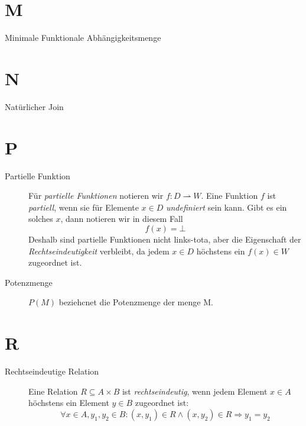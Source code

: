 \section*{M}

\begin{description}
    \item[Minimale Funktionale Abhängigkeitsmenge]
\end{description}

\section*{N}

\begin{description}
    \item[Natürlicher Join]
\end{description}


\section*{P}

\begin{description}
    \item[Partielle Funktion]
    Für \textit{partielle Funktionen} notieren wir $f : D \rightharpoonup W$.
    Eine Funktion $f$ ist \textit{partiell}, wenn sie für Elemente $x \in D$ \textit{undefiniert} sein kann.
    Gibt es ein solches $x$, dann notieren wir in diesem Fall
    \[
        f(x) = \bot
    \]
    \noindent
    Deshalb sind partielle Funktionen nicht links-tota, aber die Eigenschaft der \textit{Rechtseindeutigkeit} verbleibt, da jedem $x \in D$ höchstens ein $f(x) \in W$ zugeordnet ist.
\end{description}

\begin{description}
    \item[Potenzmenge]
    $P(M)$ beziehcnet die Potenzmenge der menge M.
\end{description}



\section*{R}

\begin{description}
    \item[Rechtseindeutige Relation]
    Eine Relation $R \subseteq A \times B$ ist \textit{rechtseindeutig}, wenn jedem Element $x \in A$ höchstens ein Element $y \in B$ zugeordnet ist:
    \[
        \forall x \in A, y_1, y_2 \in B : (x, y_1) \in R \land (x, y_2) \in R \Rightarrow  y_1 = y_2
    \]
\end{description}


